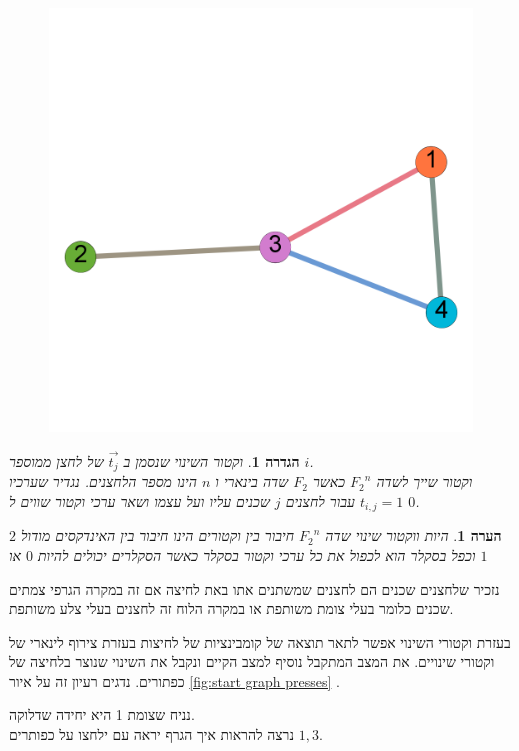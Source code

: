 \documentclass[12pt,twoside]{article}
\newtheorem{definition}{הגדרה}[section]
\newtheorem{comm}{הערה}[section]
\newcommand{\Fn}{{F_2}^n}
\begin{document}
\begin{figure}[ht]
    \caption{}
    \label{fig:numbering_graph}
    \unsethebrew
    \centering
    \includegraphics[width=.7\textwidth,height=.7\textheight,keepaspectratio]{images/numbering_graph.PNG}
\end{figure}
\sethebrew

\begin{definition}
    וקטור השינוי
    שנסמן ב
    $\vec{t_j}$
    של לחצן
    ממוספר
    $i$.
    \\
    וקטור
    שייך 
    לשדה 
    $\Fn$
    כאשר 
    $F_2$
    שדה בינארי
    ו 
    $n$
    הינו מספר הלחצנים.
    נגדיר שערכיו
    $t_{i,j} = 1$
    עבור
    לחצנים
    $j$
    שכנים עליו ועל עצמו
    ושאר ערכי וקטור שווים ל
    $0$.
\end{definition}

\begin{comm}
    היות ווקטור שינוי שדה
    $\Fn$
    חיבור בין וקטורים הינו חיבור בין האינדקסים מודול 
    $2$
    וכפל בסקלר
    הוא לכפול את כל ערכי וקטור בסקלר
    כאשר הסקלרים יכולים להיות
    $0$
    או 
    $1$
\end{comm}

נזכיר שלחצנים שכנים הם לחצנים שמשתנים אתו באת לחיצה 
אם זה במקרה הגרפי צמתים שכנים כלומר בעלי צומת משותפת
או במקרה הלוח זה לחצנים בעלי צלע משותפת.

בעזרת וקטורי השינוי אפשר לתאר תוצאה של קומבינציות של לחיצות
בעזרת צירוף לינארי של וקטורי שינויים.
את המצב המתקבל נוסיף למצב הקיים ונקבל את השינוי שנוצר בלחיצה של כפתורים.
נדגים רעיון זה על איור
\ref{fig:start graph presses}
.

נניח שצומת 1 היא יחידה שדלוקה.
\\
נרצה להראות איך הגרף יראה עם ילחצו על כפותרים 
$1, 3$.
\end{document}
